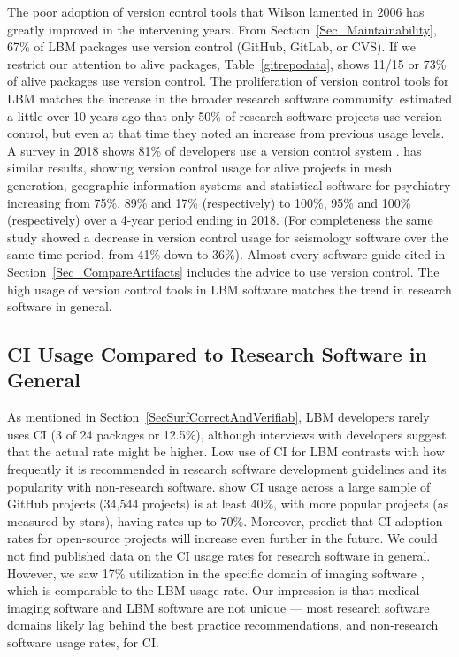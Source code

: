 \documentclass[final, 3p, times, authoryear]{elsarticle}
\begin{document}
The poor adoption of version control tools that Wilson lamented in 2006
\citep{Wilson2006} has greatly improved in the intervening years.  From
Section~\ref{Sec_Maintainability}, 67\% of LBM packages use version control
(GitHub, GitLab, or CVS). If we restrict our attention to alive packages,
Table~\ref{gitrepodata}, shows 11/15 or 73\% of alive packages use version
control. The proliferation of version control tools for LBM matches the increase
in the broader research software community. \citet{Nguyen-HoanEtAl2010}
estimated a little over 10 years ago that only 50\% of research software
projects use version control, but even at that time they noted an increase from
previous usage levels. A survey in 2018 shows 81\% of developers use a version
control system \citep{AlNoamanyAndBorghi2018}. \citet{Smith2018} has similar
results, showing version control usage for alive projects in mesh generation,
geographic information systems and statistical software for psychiatry
increasing from 75\%, 89\% and 17\% (respectively) to 100\%, 95\% and 100\%
(respectively) over a 4-year period ending in 2018.  (For completeness the same
study showed a decrease in version control usage for seismology software over
the same time period, from 41\% down to 36\%).  Almost every software guide
cited in Section~\ref{Sec_CompareArtifacts} includes the advice to use version
control. The high usage of version control tools in LBM software matches the
trend in research software in general.

\subsection{CI Usage Compared to Research Software in General}

As mentioned in Section~\ref{SecSurfCorrectAndVerifiab}, LBM developers rarely
uses CI (3 of 24 packages or 12.5\%), although interviews with developers
suggest that the actual rate might be higher. Low use of CI for LBM contrasts
with how frequently it is recommended in research software development
guidelines
\citep{BrettEtAl2021, Brown2015, ThielEtAl2020, Zadka2018, vanGompelEtAl2016}
and its popularity with non-research software. \citet{HiltonEtAl2016} show CI
usage across a large sample of GitHub projects (34,544 projects) is at least
40\%, with more popular projects (as measured by stars), having rates up to
70\%. Moreover, \citet{HiltonEtAl2016} predict that CI adoption rates for
open-source projects will increase even further in the future.  We could not
find published data on the CI usage rates for research software in general.
However, we saw 17\% utilization in the specific domain of imaging software
\citep{Dong2021}, which is comparable to the LBM usage rate. Our impression is
that medical imaging software and LBM software are not unique --- most research
software domains likely lag behind the best practice recommendations, and
non-research software usage rates, for CI.
\end{document}
